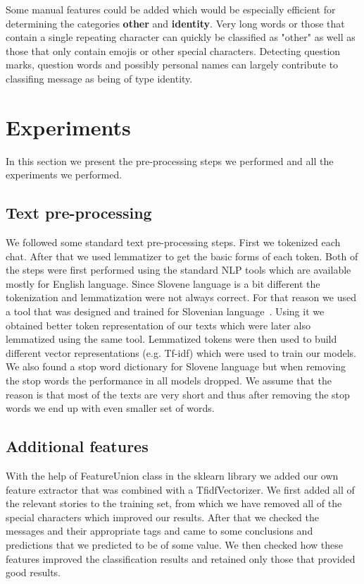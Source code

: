 \documentclass[11pt,a4paper]{article}
\begin{document}
Some manual features could be added which would be especially efficient for determining the categories \textbf{other} and \textbf{identity}.
Very long words or those that contain a single repeating character can quickly be classified as "other" as well as those that only contain emojis or other special characters.
Detecting question marks, question words and possibly personal names can largely contribute to classifing message as being of type identity.

\section{Experiments}
In this section we present the pre-processing steps we performed and all the experiments we performed.

\subsection{Text pre-processing}
We followed some standard text pre-processing steps.
First we tokenized each chat.
After that we used lemmatizer to get the basic forms of each token.
Both of the steps were first performed using the standard NLP tools which are available mostly for English language.
Since Slovene language is a bit different the tokenization and lemmatization were not always correct.
For that reason we used a tool that was designed and trained for Slovenian language~\cite{slotokenizer}.
Using it we obtained better token representation of our texts which were later also lemmatized using the same tool.
Lemmatized tokens were then used to build different vector representations (e.g. Tf-idf) which were used to train our models.
We also found a stop word dictionary for Slovene language but when removing the stop words the performance in all models dropped.
We assume that the reason is that most of the texts are very short and thus after removing the stop words we end up with even smaller set of words.

\subsection{Additional features}

With the help of FeatureUnion class in the sklearn library we added our own feature extractor that was combined with a TfidfVectorizer.
We first added all of the relevant stories to the training set, from which we have removed all of the special characters which improved our results.
After that we checked the messages and their appropriate tags and came to some conclusions and predictions that we predicted to be of some value.
We then checked how these features improved the classification results and retained only those that provided good results.
\end{document}
